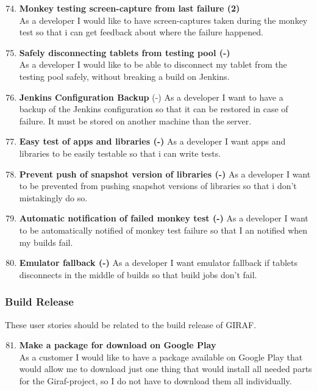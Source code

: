 \begin{enumerate}
	\setcounter{enumi}{73} %
	\item \textbf{Monkey testing screen-capture from last failure (2)}\\
	As a developer I would like to have screen-captures taken during the monkey test so that i can get feedback about where the failure happened. 
	
	\item \textbf{Safely disconnecting tablets from testing pool (-)}\\
	As a developer I would like to be able to disconnect my tablet from the testing pool safely, without breaking a build on Jenkins.
	
	\item \textbf{Jenkins Configuration Backup} (-)
	As a developer I want to have a backup of the Jenkins configuration so that it can be restored in case of failure. It must be stored on another machine than the server.
	
	\item \textbf{Easy test of apps and libraries (-)}
	As a developer I want apps and libraries to be easily testable so that i can write tests.
	
	\item \textbf{Prevent push of snapshot version of libraries (-)}
	As a developer I want to be prevented from pushing snapshot versions of libraries so that i don't mistakingly do so.
	
	\item \textbf{Automatic notification of failed monkey test (-)}
	As a developer I want to be automatically notified of monkey test failure so that I an notified when my builds fail.
	
	\item \textbf{Emulator fallback (-)}
	As a developer I want emulator fallback if tablets disconnects in the middle of builds so that build jobs don't fail.
	
\end{enumerate}

\subsubsection{Build Release}
These user stories should be related to the build release of GIRAF.

\begin{enumerate}
	\setcounter{enumi}{80} %
	\item \textbf{Make a package for download on Google Play}\\
	As a customer I would like to have a package available on Google Play that would allow me to download just one thing that would install all needed parts for the Giraf-project, so I do not have to download them all individually.
\end{enumerate}

